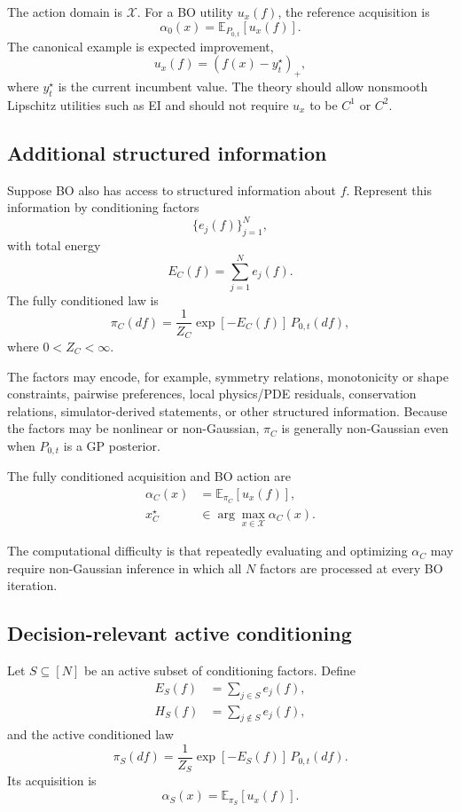 The action domain is $\mathcal X$.  For a BO utility $u_x(f)$, the reference
acquisition is
\[
    \alpha_0(x) = \mathbb E_{P_{0,t}}[u_x(f)].
\]
The canonical example is expected improvement,
\[
    u_x(f) = (f(x)-y_t^\star)_+,
\]
where $y_t^\star$ is the current incumbent value.  The theory should allow
nonsmooth Lipschitz utilities such as EI and should not require $u_x$ to be
$C^1$ or $C^2$.

\subsection{Additional structured information}

Suppose BO also has access to structured information about $f$.  Represent this
information by conditioning factors
\[
    \{e_j(f)\}_{j=1}^N,
\]
with total energy
\[
    E_C(f) = \sum_{j=1}^N e_j(f).
\]
The fully conditioned law is
\begin{equation}
    \pi_C(df)
    = \frac{1}{Z_C}
      \exp[-E_C(f)]\,P_{0,t}(df),
    \label{eq:full-conditioned-law}
\end{equation}
where $0<Z_C<\infty$.

The factors may encode, for example, symmetry relations, monotonicity or shape
constraints, pairwise preferences, local physics/PDE residuals, conservation
relations, simulator-derived statements, or other structured information.
Because the factors may be nonlinear or non-Gaussian, $\pi_C$ is generally
non-Gaussian even when $P_{0,t}$ is a GP posterior.

The fully conditioned acquisition and BO action are
\begin{align}
    \alpha_C(x)
    &= \mathbb E_{\pi_C}[u_x(f)], \\
    x_C^\star
    &\in \arg\max_{x\in\mathcal X}\alpha_C(x).
\end{align}

The computational difficulty is that repeatedly evaluating and optimizing
$\alpha_C$ may require non-Gaussian inference in which all $N$ factors are
processed at every BO iteration.

\subsection{Decision-relevant active conditioning}

Let $S\subseteq[N]$ be an active subset of conditioning factors.  Define
\begin{align}
    E_S(f) &= \sum_{j\in S} e_j(f), \\
    H_S(f) &= \sum_{j\notin S} e_j(f),
\end{align}
and the active conditioned law
\begin{equation}
    \pi_S(df)
    = \frac{1}{Z_S}\exp[-E_S(f)]\,P_{0,t}(df).
    \label{eq:active-conditioned-law}
\end{equation}
Its acquisition is
\[
    \alpha_S(x)=\mathbb E_{\pi_S}[u_x(f)].
\]

